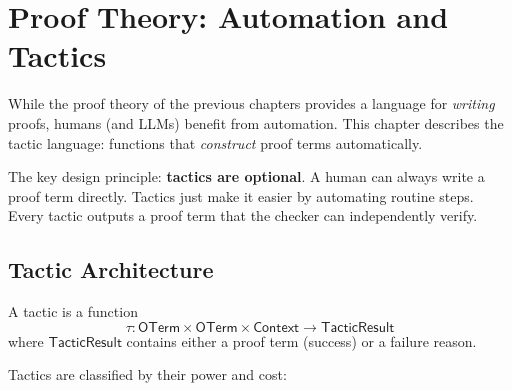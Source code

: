 
\chapter{Proof Theory: Automation and Tactics}
\label{ch:proof-theory-automation}

While the proof theory of the previous chapters provides a language for
\emph{writing} proofs, humans (and LLMs) benefit from automation.
This chapter describes the tactic language: functions that
\emph{construct} proof terms automatically.

The key design principle: \textbf{tactics are optional}.  A human can
always write a proof term directly.  Tactics just make it easier by
automating routine steps.  Every tactic outputs a proof term that
the checker can independently verify.

\section{Tactic Architecture}

A tactic is a function
\[
  \tau : \mathsf{OTerm} \times \mathsf{OTerm} \times \mathsf{Context}
  \to \mathsf{TacticResult}
\]
where $\mathsf{TacticResult}$ contains either a proof term (success)
or a failure reason.

Tactics are classified by their power and cost:

